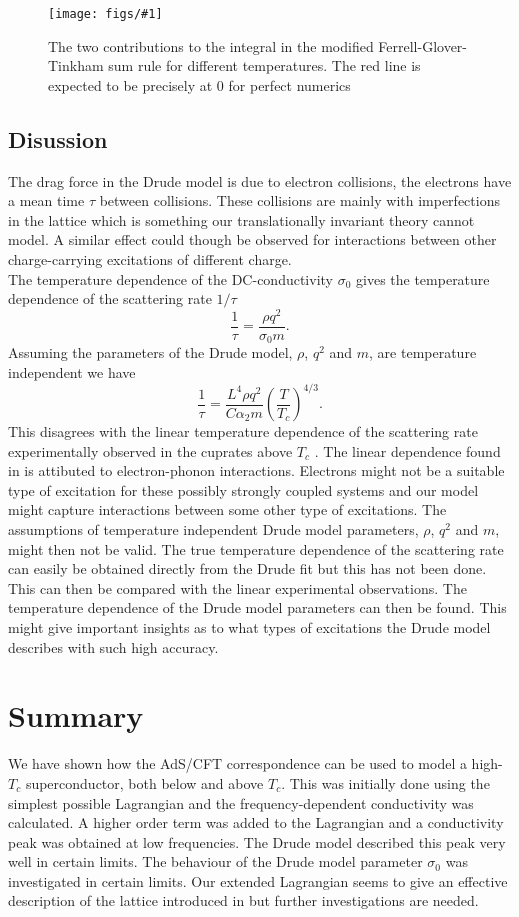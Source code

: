 \documentclass[12pt]{report}
\newcommand{\fig}[2]{
\begin{figure}
\centering
\texttt{[image: figs/\#1]}
\caption{#2}
\end{figure}
}
\begin{document}
\fig{sum_rule_a20.1}{The two contributions to the integral in the modified Ferrell-Glover-Tinkham sum rule for different temperatures. The red line is expected to be precisely at 0 for perfect numerics\label{f:sum2}}

\section{Disussion}
The drag force in the Drude model is due to electron collisions, the electrons have a mean time $\tau$ between collisions. These collisions are mainly with imperfections in the lattice which is something our translationally invariant theory cannot model. A similar effect could though be observed for interactions between other charge-carrying excitations of different charge.\\
The temperature dependence of the DC-conductivity $\sigma_0$ gives the temperature dependence of the scattering rate $1/\tau$
\begin{equation}
  \frac{1}{\tau}=\frac{\rho q^2}{\sigma_0m}.
\end{equation}
Assuming the parameters of the Drude model, $\rho$, $q^2$ and $m$, are temperature independent we have
\begin{equation}
  \frac{1}{\tau}=\frac{L^4\rho q^2}{C\alpha_2m}\left(\frac{T}{T_c}\right)^{4/3}.
\end{equation}
This disagrees with the linear temperature dependence of the scattering rate experimentally observed in the cuprates above $T_c$ \cite{drudeFit}. The linear dependence found in \cite{drudeFit} is attibuted to electron-phonon interactions. Electrons might not be a suitable type of excitation for these possibly strongly coupled systems and our model might capture interactions between some other type of excitations. The assumptions of temperature independent Drude model parameters, $\rho$, $q^2$ and $m$, might then not be valid. The true temperature dependence of the scattering rate can easily be obtained directly from the Drude fit but this has not been done. This can then be compared with the linear experimental observations. The temperature dependence of the Drude model parameters can then be found. This might give important insights as to what types of excitations the Drude model describes with such high accuracy.
\chapter{Summary}
We have shown how the AdS/CFT correspondence can be used to model a high-$T_c$ superconductor, both below and above $T_c$. This was initially done using the simplest possible Lagrangian and the frequency-dependent conductivity was calculated. A higher order term was added to the Lagrangian and a conductivity peak was obtained at low frequencies. The Drude model described this peak very well in certain limits. The behaviour of the Drude model parameter $\sigma_0$ was investigated in certain limits. Our extended Lagrangian seems to give an effective description of the lattice introduced in \cite{horowitz} but further investigations are needed.
\end{document}

